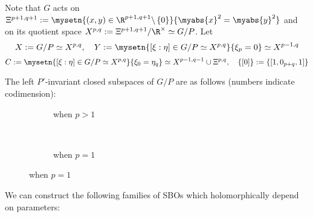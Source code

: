 \documentclass[pdf]{beamer}
\renewcommand{\setminus}{\backslash}
\theoremstyle{mystyle}
\theoremstyle{remark}
\begin{document}
\begin{frame}
Note that $G$ acts on $\Xi^{p+1,q+1}:=\mysetn{(x,y)\in\R^{p+1,q+1}\setminus\left\{ 0 \right\}}{\myabs{x}^2=\myabs{y}^2}$ and on its quotient space
$X^{p,q}:=\Xi^{p+1,q+1}/\R^{\times}\simeq G/P$. Let
\[
	X:=G/P\simeq X^{p,q},\quad Y:=\mysetn{[\xi:\eta]\in G/P\simeq X^{p,q}}{\xi_{p}=0}\simeq X^{p-1,q}\]
	\[C:=\mysetn{[\xi:\eta]\in G/P\simeq X^{p,q}}{\xi_{0}=\eta_q}\simeq X^{p-1,q-1}\cup\Xi^{p,q},\quad\left\{ [0] \right\}:=\left\{ [1,0_{p+q},1] \right\}\]
\begin{theorem}
	The left $P'$-invariant closed subspaces of $G/P$ are as follows (numbers indicate codimension):\\
  \begin{figure}[H]
    \centering
    \begin{subfigure}[t]{0.3\textwidth}
	    \xymatrixrowsep{0.5pc}
	\caption{when $p>1$}
    \end{subfigure}
    ~ %
    \begin{subfigure}[t]{0.3\textwidth}
	    \xymatrixrowsep{0.5pc}
	    {}
	\caption{when $p=1$}
    \end{subfigure}
\end{figure}
\end{theorem}
\end{frame}
\begin{frame}
	\begin{theorem}
		We can construct the following families of SBOs which holomorphically depend on parameters:
		
	\end{theorem}
\end{frame}
\end{document}
